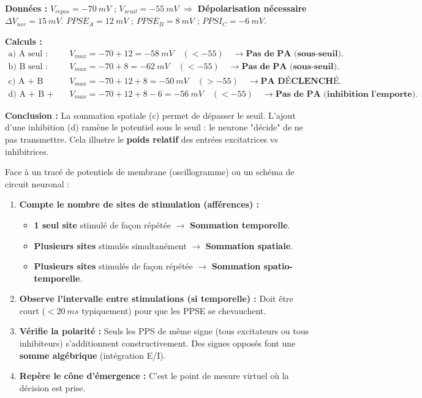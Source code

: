 \documentclass[11pt]{article}
\begin{document}
\begin{exoresolu}
\textbf{Données :} $V_{repos} = \SI{-70}{mV}$ ; $V_{seuil} = \SI{-55}{mV}$ $\Rightarrow$ \textbf{Dépolarisation nécessaire} $\Delta V_{nec} = \SI{15}{mV}$.
$PPSE_A = \SI{+12}{mV}$ ; $PPSE_B = \SI{+8}{mV}$ ; $PPSI_C = \SI{-6}{mV}$.

\tcblower

\textbf{Calculs :}
\begin{align*}
\text{a) A seul :} \quad & V_{max} = -70 + 12 = \SI{-58}{mV} \quad (< -55) \quad \rightarrow \textbf{Pas de PA (sous-seuil)}. \\
\text{b) B seul :} \quad & V_{max} = -70 + 8 = \SI{-62}{mV} \quad (< -55) \quad \rightarrow \textbf{Pas de PA (sous-seuil)}. \\
\text{c) A + B (Sommation spatiale) :} \quad & V_{max} = -70 + 12 + 8 = \SI{-50}{mV} \quad (> -55) \quad \rightarrow \textbf{PA DÉCLENCHÉ}. \\
\text{d) A + B + C (Intégration E/I) :} \quad & V_{max} = -70 + 12 + 8 - 6 = \SI{-56}{mV} \quad (< -55) \quad \rightarrow \textbf{Pas de PA (inhibition l'emporte)}.
\end{align*}

\textbf{Conclusion :} La sommation spatiale (c) permet de dépasser le seuil. L'ajout d'une inhibition (d) ramène le potentiel sous le seuil : le neurone "décide" de ne pas transmettre. Cela illustre le \textbf{poids relatif} des entrées excitatrices vs inhibitrices.
\end{exoresolu}

\begin{methode}
Face à un tracé de potentiels de membrane (oscillogramme) ou un schéma de circuit neuronal :
\begin{enumerate}
    \item \textbf{Compte le nombre de sites de stimulation (afférences) :}
    \begin{itemize}
        \item \textbf{1 seul site} stimulé de façon répétée $\rightarrow$ \textbf{Sommation temporelle}.
        \item \textbf{Plusieurs sites} stimulés simultanément $\rightarrow$ \textbf{Sommation spatiale}.
        \item \textbf{Plusieurs sites} stimulés de façon répétée $\rightarrow$ \textbf{Sommation spatio-temporelle}.
    \end{itemize}
    \item \textbf{Observe l'intervalle entre stimulations (si temporelle) :} Doit être court ($< \SI{20}{ms}$ typiquement) pour que les PPSE se chevauchent.
    \item \textbf{Vérifie la polarité :} Seuls les PPS de même signe (tous excitateurs ou tous inhibiteurs) s'additionnent constructivement. Des signes opposés font une \textbf{somme algébrique} (intégration E/I).
    \item \textbf{Repère le cône d'émergence :} C'est le point de mesure virtuel où la décision est prise.
\end{enumerate}
\end{methode}
\end{document}
